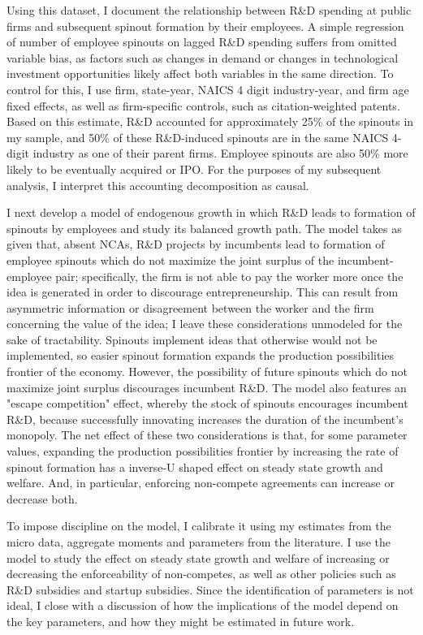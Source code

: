 \documentclass[12pt,english]{article}
\theoremstyle{remark}
\begin{document}
Using this dataset, I document the relationship between R\&D spending at public firms and subsequent spinout formation by their employees. A simple regression of number of employee spinouts on lagged R\&D spending suffers from omitted variable bias, as factors such as changes in demand or changes in technological investment opportunities likely affect both variables in the same direction. To control for this, I use firm, state-year, NAICS 4 digit industry-year, and firm age fixed effects, as well as firm-specific controls, such as citation-weighted patents. Based on this estimate, R\&D accounted for approximately 25\% of the spinouts in my sample, and 50\% of these R\&D-induced spinouts are in the same NAICS 4-digit industry as one of their parent firms. Employee spinouts are also 50\% more likely to be eventually acquired or IPO. For the purposes of my subsequent analysis, I interpret this accounting decomposition as causal. 

I next develop a model of endogenous growth in which R\&D leads to formation of spinouts by employees and study its balanced growth path. The model takes as given that, absent NCAs, R\&D projects by incumbents lead to formation of employee spinouts which do not maximize the joint surplus of the incumbent-employee pair; specifically, the firm is not able to pay the worker more once the idea is generated in order to discourage entrepreneurship. This can result from asymmetric information or disagreement between the worker and the firm concerning the value of the idea; I leave these considerations unmodeled for the sake of tractability. Spinouts implement ideas that otherwise would not be implemented, so easier spinout formation expands the production possibilities frontier of the economy. However, the possibility of future spinouts which do not maximize joint surplus discourages incumbent R\&D. The model also features an "escape competition" effect, whereby the stock of spinouts encourages incumbent R\&D, because successfully innovating increases the duration of the incumbent's monopoly. The net effect of these two considerations is that, for some parameter values, expanding the production possibilities frontier by increasing the rate of spinout formation has a inverse-U shaped effect on steady state growth and welfare. And, in particular, enforcing non-compete agreements can increase or decrease both.

To impose discipline on the model, I calibrate it using my estimates from the micro data, aggregate moments and parameters from the literature. I use the model to study the effect on steady state growth and welfare of increasing or decreasing the enforceability of non-competes, as well as other policies such as R\&D subsidies and startup subsidies. Since the identification of parameters is not ideal, I close with a discussion of how the implications of the model depend on the key parameters, and how they might be estimated in future work. 
\end{document}
